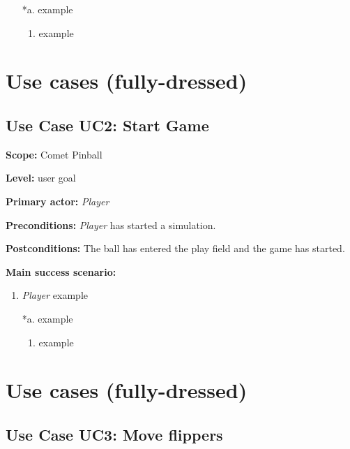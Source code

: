 \documentclass[fontsize=12pt,
               paper=a4,
               twoside=false,
               parskip=half,
               ]{scrartcl}
\begin{document}
\begin{itemize}[leftmargin=3em]
	\item[*a.] example
	\begin{enumerate}
		\item example
	\end{enumerate}
\end{itemize}



\section{Use cases (fully-dressed)}

\subsection{Use Case UC2: Start Game}

\textbf{\textsf{Scope:}} Comet Pinball

\textbf{\textsf{Level:}} user goal

\textbf{\textsf{Primary actor:}} \emph{Player}

\textbf{\textsf{Preconditions:}} \emph{Player} has started a simulation.

\textbf{\textsf{Postconditions:}} The ball has entered the play field and the game has started.

\textbf{\textsf{Main success scenario:}}

\begin{enumerate}[leftmargin=3em]
	\item \emph{Player} example
\end{enumerate}


\begin{itemize}[leftmargin=3em]
	\item[*a.] example
	\begin{enumerate}
		\item example
	\end{enumerate}
\end{itemize}




\section{Use cases (fully-dressed)}

\subsection{Use Case UC3: Move flippers}
\end{document}

